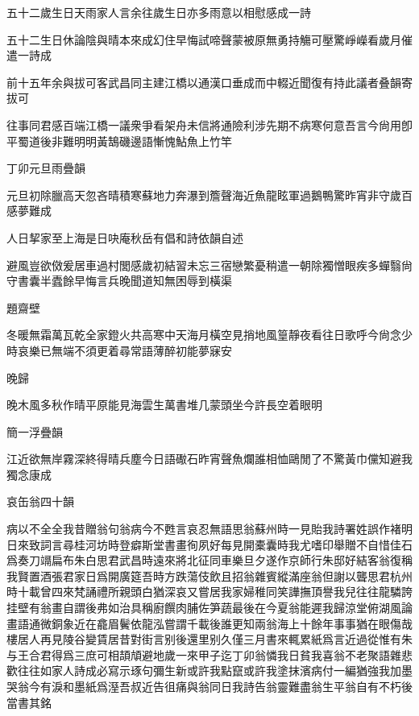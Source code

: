 \documentclass{zhvt-classic-Miya}
\begin{document}
\begin{fw}五十二歲生日天雨家人言余往歲生日亦多雨意以相慰感成一詩\end{fw}

五十二生日休論陰與晴本來成幻住早悔試啼聲蒙被原無勇持觴可壓驚崢嶸看歲月催遣一詩成

\begin{fw}前十五年余與拔可客武昌同主建江橋以通漢口垂成而中輟近聞復有持此議者叠韻寄拔可\end{fw}

往事同君感百端江橋一議衆爭看架舟未信將通險利涉先期不病寒何意吾言今尙用卽平蜀道後非難明明黃鵠磯邊語慚愧鮎魚上竹竿

\begin{fw}丁卯元旦雨疊韻\end{fw}

元旦初除臘高天忽吝晴積寒蘇地力奔瀑到簷聲海近魚龍眩軍過鵝鴨驚昨宵非守歲百感夢難成

\begin{fw}人日挈家至上海是日吷庵秋岳有倡和詩依韻自述\end{fw}

避風豈欲傚爰居車過村閭感歲初結習未忘三宿戀繁憂稍遣一朝除獨憎眼疾多蟬翳尙守書囊半蠹餘早悔言兵晚聞道知無困辱到橫渠

\begin{fw}題齋壁\end{fw}

冬暖無霜萬瓦乾全家鐙火共高寒中天海月橫空見捎地風篁靜夜看往日歌呼今尙念少時哀樂已無端不須更着尋常語薄醉初能夢寐安

\begin{fw}晚歸\end{fw}

晚木風多秋作晴平原能見海雲生萬書堆几蒙頭坐今許長空着眼明

\begin{fw}簡一浮疊韻\end{fw}

江近欲無岸霧深終得晴兵塵今日語礮石昨宵聲魚爛誰相恤鷗閒了不驚黃巾儻知避我獨念康成

\begin{fw}哀缶翁四十韻\end{fw}

病以不全全我昔贈翁句翁病今不甦言哀忍無語思翁蘇州時一見貽我詩署姓誤作褚明日來致詞言尋桂河坊時登癖斯堂書畫徇夙好每見開橐囊時我尤嗜印舉贈不自惜佳石爲奏刀竵扁布朱白思君武昌時遠來將北征同車樂旦夕遂作京師行朱邸好結客翁復稱我賢置酒張君家日爲開廣筵吾時方跌蕩伎飲且招翁雜賓縱滿座翁但謝以聾思君杭州時十載曾四來梵誦禮所親頭白猶深哀又嘗居我家婦稚同笑譁撫頂譽我兒往往龍驎誇挂壁有翁畫自謂後弗如治具稱廚饌肉脯佐笋蔬最後在今夏翁能遲我歸涼堂俯湖風論畫語通微銅象近在龕眉鬢依龍泓嘗謂千載後誰更知兩翁海上十餘年事事猶在眼傷哉樓居人再見陵谷變賃居昔對街言别後還里别久僅三月書來輒累紙爲言近過從惟有朱与王合君得爲三庶可相頡頏避地歲一來甲子迄丁卯翁憐我日貧我喜翁不老聚語雜悲歡往往如家人詩成必寫示琢句彌生新或許我點竄或許我塗抹濱病付一編猶強我加墨哭翁今有淚和墨紙爲溼吾叔近告徂痛與翁同日我詩告翁靈難盡翁生平翁自有不朽後當書其銘
\end{document}
